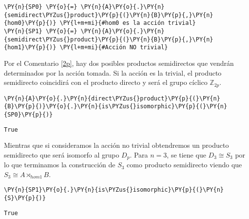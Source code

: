 \begin{enumerate}
\begin{tcolorbox}[breakable, size=fbox, boxrule=1pt, pad at break*=1mm,colback=cellbackground, colframe=cellborder]
\begin{Verbatim}[commandchars=\\\{\}]
\PY{n}{SP0} \PY{o}{=} \PY{n}{A}\PY{o}{.}\PY{n}{semidirect\PYZus{}product}\PY{p}{(}\PY{n}{B}\PY{p}{,}\PY{n}{hom0}\PY{p}{)} \PY{l+m+mi}{#hom0 es la acción trivial}
\PY{n}{SP1} \PY{o}{=} \PY{n}{A}\PY{o}{.}\PY{n}{semidirect\PYZus{}product}\PY{p}{(}\PY{n}{B}\PY{p}{,}\PY{n}{hom1}\PY{p}{)} \PY{l+m+mi}{#Acción NO trivial}
\end{Verbatim}
\end{tcolorbox}

Por el Comentario \ref{2p}, hay dos posibles productos semidirectos que vendrán determinados por la acción tomada. 
Si la acción es la trivial, el producto semidirecto coincidirá con el producto directo y será el grupo cíclico $\mathbb{Z}_{2p}$.


    \begin{tcolorbox}[breakable, size=fbox, boxrule=1pt, pad at break*=1mm,colback=cellbackground, colframe=cellborder]
\begin{Verbatim}[commandchars=\\\{\}]
\PY{n}{A}\PY{o}{.}\PY{n}{direct\PYZus{}product}\PY{p}{(}\PY{n}{B}\PY{p}{)}\PY{o}{.}\PY{n}{is\PYZus{}isomorphic}\PY{p}{(}\PY{n}{SP0}\PY{p}{)}
\end{Verbatim}
\end{tcolorbox}

            \begin{tcolorbox}[breakable, size=fbox, boxrule=.5pt, pad at break*=1mm, opacityfill=0]
\begin{Verbatim}[commandchars=\\\{\}]
True
\end{Verbatim}
\end{tcolorbox}
        

Mientras que si consideramos la acción no trivial obtendremos un producto semidirecto que será isomorfo al grupo $D_p$. Para $n=3$, se tiene que $D_3 \cong S_3$ por lo que terminamos la construcción de $S_3$ como producto semidirecto viendo que $S_3 \cong A \rtimes_{hom1} B$.
\begin{tcolorbox}[breakable, size=fbox, boxrule=1pt, pad at break*=1mm,colback=cellbackground, colframe=cellborder]
\begin{Verbatim}[commandchars=\\\{\}]
\PY{n}{SP1}\PY{o}{.}\PY{n}{is\PYZus{}isomorphic}\PY{p}{(}\PY{n}{S}\PY{p}{)}
\end{Verbatim}
\end{tcolorbox}


\begin{tcolorbox}[breakable, size=fbox, boxrule=.5pt, pad at break*=1mm, opacityfill=0]
\begin{Verbatim}[commandchars=\\\{\}]
True
\end{Verbatim}
\end{tcolorbox}



\end{enumerate}
